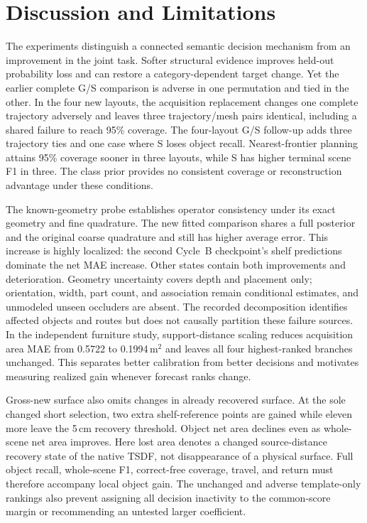\section{Discussion and Limitations}\label{discussion}
The experiments distinguish a connected semantic decision mechanism from an improvement in the joint task. Softer structural evidence improves held-out probability loss and can restore a category-dependent target change. Yet the earlier complete G/S comparison is adverse in one permutation and tied in the other. In the four new layouts, the acquisition replacement changes one complete trajectory adversely and leaves three trajectory/mesh pairs identical, including a shared failure to reach 95\% coverage. The four-layout G/S follow-up adds three trajectory ties and one case where S loses object recall. Nearest-frontier planning attains 95\% coverage sooner in three layouts, while S has higher terminal scene F1 in three. The class prior provides no consistent coverage or reconstruction advantage under these conditions.

The known-geometry probe establishes operator consistency under its exact geometry and fine quadrature. The new fitted comparison shares a full posterior and the original coarse quadrature and still has higher average error. This increase is highly localized: the second Cycle~B checkpoint's shelf predictions dominate the net MAE increase. Other states contain both improvements and deterioration. Geometry uncertainty covers depth and placement only; orientation, width, part count, and association remain conditional estimates, and unmodeled unseen occluders are absent. The recorded decomposition identifies affected objects and routes but does not causally partition these failure sources. In the independent furniture study, support-distance scaling reduces acquisition area MAE from 0.5722 to 0.1994\,m$^2$ and leaves all four highest-ranked branches unchanged. This separates better calibration from better decisions and motivates measuring realized gain whenever forecast ranks change.

Gross-new surface also omits changes in already recovered surface. At the sole changed short selection, two extra shelf-reference points are gained while eleven more leave the 5\,cm recovery threshold. Object net area declines even as whole-scene net area improves. Here lost area denotes a changed source-distance recovery state of the native TSDF, not disappearance of a physical surface. Full object recall, whole-scene F1, correct-free coverage, travel, and return must therefore accompany local object gain. The unchanged and adverse template-only rankings also prevent assigning all decision inactivity to the common-score margin or recommending an untested larger coefficient.

